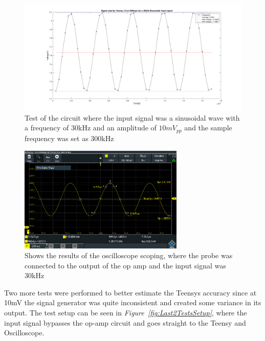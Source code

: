 \begin{figure}[h]
    \centering
    \includegraphics[width=1.0\textwidth]{graphics/30kin_300ksampl.png}
    \caption{Test of the circuit where the input signal was a sinusoidal wave with a frequency of 30kHz and an amplitude of $10mV_{pp}$ and the sample frequency was set as 300kHz}
    \label{fig:Teensy30k300k}
\end{figure}

\begin{figure}[h]
    \centering
    \includegraphics[width=0.7\textwidth]{graphics/30k10mvPP300ksamp.PNG}
    \caption{Shows the results of the oscilloscope scoping, where the probe was connected to the output of the op amp and the input signal was 30kHz}
    \label{fig:Oscillo30k300k}
\end{figure}



\clearpage


Two more tests were performed to better estimate the Teensys accuracy since at 10mV the signal generator was quite inconsistent and created some variance in its output. 
The test setup can be seen in \textit{Figure~\ref{fig:Last2TestsSetup}}, where the input signal bypasses the op-amp circuit and goes straight to the Teensy and Oscilloscope.

